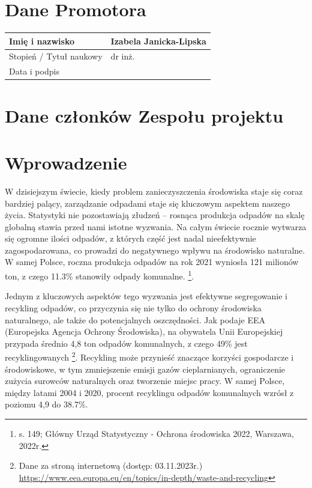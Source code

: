 \documentclass[12pt, a4paper, twoside, openany]{book}
\newcommand{\forceindent}{\leavevmode{\parindent=1.3em\indent}}
\begin{document}
\section{Dane Promotora}

\noindent
\begin{tabular}{ |p{5cm}|p{7cm}|}
    \hline
    Imię i nazwisko         & Izabela Janicka-Lipska \\
    \hline
    Stopień / Tytuł naukowy & dr inż.               \\
    \hline
    Data i podpis           &                        \\ \hline
\end{tabular}

\section{Dane członków Zespołu projektu}

\membersTable

\section{Wprowadzenie}
\forceindent W dzisiejszym świecie, kiedy problem zanieczyszczenia środowiska staje się coraz bardziej palący, zarządzanie odpadami staje się kluczowym aspektem naszego życia. Statystyki nie pozostawiają złudzeń -- rosnąca produkcja odpadów na skalę globalną stawia przed nami istotne wyzwania. Na całym świecie rocznie wytwarza się ogromne ilości odpadów, z których część jest nadal nieefektywnie zagospodarowana, co prowadzi do negatywnego wpływu na środowisko naturalne. W samej Polsce, roczna produkcja odpadów na rok 2021 wyniosła 121 milionów ton, z czego 11.3\% stanowiły odpady komunalne. \footnote{s. 149; Główny Urząd Statystyczny - Ochrona środowiska 2022, Warszawa, 2022r.}.

Jednym z kluczowych aspektów tego wyzwania jest efektywne segregowanie i recykling odpadów, co przyczynia się nie tylko do ochrony środowiska naturalnego, ale także do potencjalnych oszczędności. Jak podaje EEA (Europejska Agencja Ochrony Środowiska), na obywatela Unii Europejskiej przypada średnio 4,8 ton odpadów komunalnych, z czego 49\% jest recyklingowanych \footnote{Dane za stroną internetową (dostęp: 03.11.2023r.) \url{https://www.eea.europa.eu/en/topics/in-depth/waste-and-recycling}}. Recykling może przynieść znaczące korzyści gospodarcze i środowiskowe, w tym zmniejszenie emisji gazów cieplarnianych, ograniczenie zużycia surowców naturalnych oraz tworzenie miejsc pracy. W samej Polsce, między latami 2004 i 2020, procent recyklingu odpadów komunalnych wzrósł z poziomu 4,9 do 38.7\%.
\end{document}
